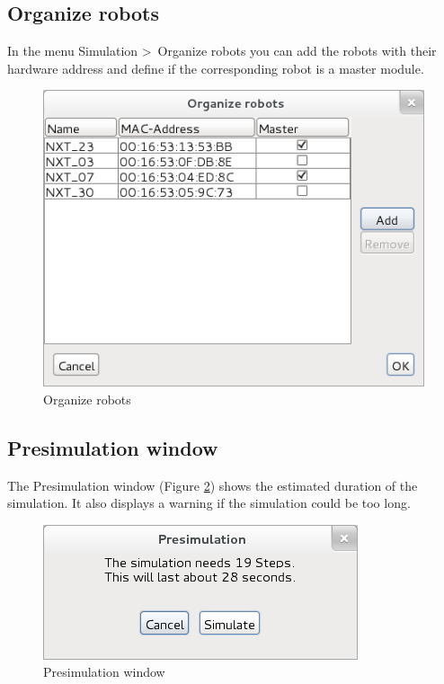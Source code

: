 \documentclass[%
  a4paper,%
  11pt,%
  blue,%
  hyperref	%
  ]{tubsartcl}
\begin{document}
\subsection{Organize robots}
In the menu Simulation \textgreater\ Organize robots you can add the robots with their hardware address and define if the corresponding robot is a master module.
\begin{figure}[!htb]
\begin{center}
\includegraphics[scale=0.45]{graphics_gui/organize_robots.png}
\end{center}
\caption{Organize robots}
\label{pic:organize_robots}
\end{figure}

\subsection{Presimulation window}
The Presimulation window (Figure \ref{pic:presimulation}) shows the estimated duration of the simulation. It also displays a warning if the simulation could be too long.
\begin{figure}[!htb]
\begin{center}
\includegraphics[scale=0.4]{graphics_gui/presimulation.png}
\end{center}
\caption{Presimulation window}
\label{pic:presimulation}
\end{figure}
\end{document}
